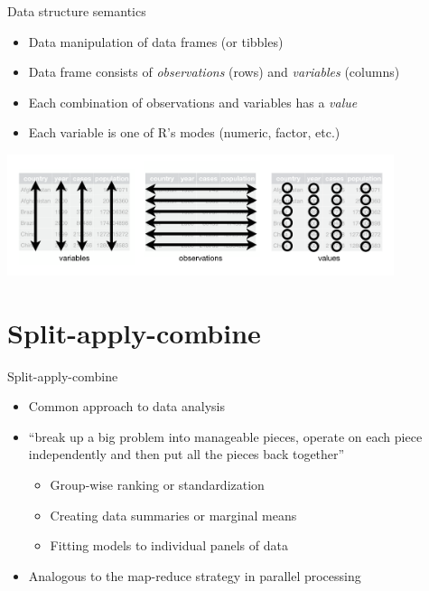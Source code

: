 \documentclass[aspectratio=169]{beamer}\usepackage[]{graphicx}\usepackage[]{color}
\begin{document}
\begin{frame}{Data structure semantics}
\begin{itemize}
	\item Data manipulation of data frames (or tibbles)
	\item Data frame consists of \emph{observations} (rows) and \emph{variables} (columns)
	\item Each combination of observations and variables has a \emph{value}
	\item Each variable is one of R's modes (numeric, factor, etc.)
\end{itemize}
\begin{center}
	\includegraphics[width=0.85\textwidth]{./images/data-semantics}
\end{center}
\end{frame}

\section{Split-apply-combine}
\begin{frame}{Split-apply-combine}
\begin{itemize}
	\item Common approach to data analysis
	\item ``break up a big problem into manageable pieces, operate on each piece independently and then put all the pieces back together''
  \begin{itemize}
  	\item Group-wise ranking or standardization
  	\item Creating data summaries or marginal means
  	\item Fitting models to individual panels of data
  \end{itemize}
  \item Analogous to the map-reduce strategy in parallel processing
\end{itemize}
\end{frame}
\end{document}

